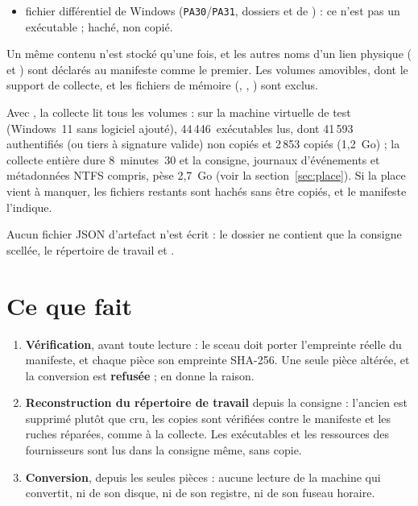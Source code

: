 \documentclass[11pt,a4paper,oneside]{report}
\begin{document}
\begin{itemize}
\begin{itemize}
                MD5, SHA-1, SHA-256, son empreinte Authenticode et la raison ;
          \item fichier différentiel de Windows (\texttt{PA30}/\texttt{PA31},
                dossiers  et  de ) : ce n'est
                pas un exécutable ; haché, non copié.
        \end{itemize}
        Un même contenu n'est stocké qu'une fois, et les autres noms d'un lien
        physique ( et ) sont déclarés au
        manifeste comme le premier. Les volumes amovibles, dont le support de
        collecte, et les fichiers de mémoire (,
        , ) sont exclus.
\end{itemize}

\begin{attention}
Avec , la collecte lit tous les volumes : sur la machine
virtuelle de test (Windows~11 sans logiciel ajouté), 44\,446~exécutables lus,
dont 41\,593 authentifiés (ou tiers à signature valide) non copiés et
2\,853 copiés (1,2~Go) ; la collecte entière dure 8~minutes~30 et la consigne,
journaux d'événements et métadonnées NTFS compris, pèse 2,7~Go (voir la
section~\ref{sec:place}). Si la place vient à manquer, les fichiers
restants sont hachés sans être copiés, et le manifeste l'indique.
\end{attention}

Aucun fichier JSON d'artefact n'est écrit : le dossier ne contient que la
consigne scellée, le répertoire de travail et .

\section{Ce que fait }

\begin{enumerate}
  \item \textbf{Vérification}, avant toute lecture : le sceau doit porter
        l'empreinte réelle du manifeste, et chaque pièce son empreinte SHA-256.
        Une seule pièce altérée, et la conversion est \textbf{refusée} ;
         en donne la raison.
  \item \textbf{Reconstruction du répertoire de travail} depuis la consigne :
        l'ancien est supprimé plutôt que cru, les copies sont vérifiées contre
        le manifeste et les ruches réparées, comme à la collecte. Les
        exécutables et les ressources des fournisseurs sont lus dans la
        consigne même, sans copie.
  \item \textbf{Conversion}, depuis les seules pièces : aucune lecture de la
        machine qui convertit, ni de son disque, ni de son registre, ni de son
        fuseau horaire.
\end{enumerate}
\end{document}
